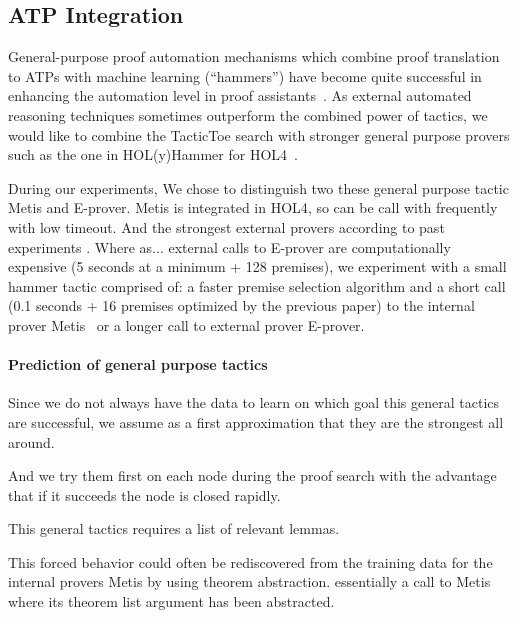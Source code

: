 \documentclass[runningheads,a4paper,draft]{svjour3}
\def\holfour{\textsf{HOL4}\xspace}
\def\eprover{\textsf{E-prover}\xspace}
\def\holyhammer{\textsf{HOL(y)Hammer}\xspace}
\def\metis{\textsf{Metis}\xspace}
\def\tactictoe{\textsf{TacticToe}\xspace}
\begin{document}
%

\subsection{ATP Integration}
General-purpose proof automation mechanisms which combine proof translation to
ATPs with machine learning (``hammers'') have become quite successful in
enhancing the automation level in proof assistants~\cite{hammers4qed}.
As external automated reasoning techniques sometimes outperform the combined 
power of tactics, we would like to combine the \tactictoe search with 
stronger general purpose provers such as the one in \holyhammer for 
\holfour~\cite{tgck-cpp15}. 

During our experiments,
We chose to distinguish two these general purpose tactic \metis and \eprover.
\metis is integrated in \holfour, so can be call with frequently with low 
timeout.
And the strongest external provers according to past experiments \cite{hh4h4}.
Where as...
external calls to \eprover are computationally expensive (5 seconds at a 
minimum +  128 premises), we  
experiment with a small hammer tactic comprised of: a faster premise 
selection algorithm and
a short call (0.1 seconds + 16 premises optimized by the previous paper) to the 
internal prover \metis~\cite{metis} or a
longer call to external prover \eprover. 




\paragraph{Prediction of general purpose tactics}
Since we do not always have the data to learn on which goal this general 
tactics are successful, we assume as a first approximation that they are the 
strongest all around. 

And we try them first on each node during the proof search with the advantage 
that if it succeeds the node is closed rapidly.

This general tactics requires a list of relevant lemmas.

This forced behavior could often be rediscovered from the training data for the 
internal provers \metis by using theorem abstraction. essentially a call to 
\metis where its 
theorem list argument has been abstracted.
\end{document}
